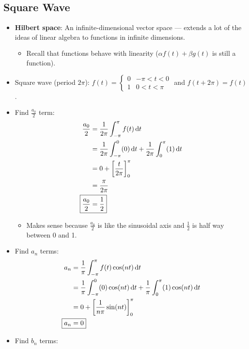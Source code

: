 \documentclass{article}
\begin{document}
\subsection*{Square Wave}
\begin{itemize}
    \item {}\textbf{Hilbert space}: An infinite-dimensional vector space --- extends a lot of the ideas of linear algebra to functions in infinite dimensions.
    \begin{itemize}
        \item Recall that functions behave with linearity ($\alpha f(t)+\beta g(t)$ is still a function).
    \end{itemize}
    \item Square wave (period $2\pi$): $
        f(t) =
        \begin{cases}
            0 & -\pi<t<0\\
            1 & 0<t<\pi
        \end{cases}
    $ and $f(t+2\pi) = f(t)$.
    \item Find $\frac{a_0}{2}$ term:
    \begin{align*}
        \frac{a_0}{2} &= \frac{1}{2\pi} \int_{-\pi}^\pi f(t)\D{t}\\
        &= \frac{1}{2\pi}\int_{-\pi}^0 (0)\D{t} + \frac{1}{2\pi}\int_0^\pi (1)\D{t}\\
        &= 0+\left[ \frac{t}{2\pi} \right]_0^\pi\\
        &= \frac{\pi}{2\pi}\\
        \Aboxed{\frac{a_0}{2} &= \frac{1}{2}}
    \end{align*}
    \begin{itemize}
        \item Makes sense because $\frac{a_0}{2}$ is like the sinusoidal axis and $\frac{1}{2}$ is half way between 0 and 1.
    \end{itemize}
    \item Find $a_n$ terms:
    \begin{align*}
        a_n &= \frac{1}{\pi}\int_{-\pi}^\pi f(t)\cos(nt)\D{t}\\
        &= \frac{1}{\pi}\int_{-\pi}^0 (0)\cos(nt)\D{t} + \frac{1}{\pi}\int_0^\pi (1)\cos(nt)\D{t}\\
        &= 0+\left[ \frac{1}{n\pi}\sin(nt) \right]_0^\pi\\
        \Aboxed{a_n &= 0}
    \end{align*}
    \item Find $b_n$ terms:
    \begin{align*}

\end{align*}
\end{itemize}
\end{document}
